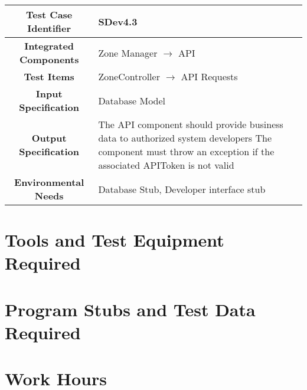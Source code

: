 \documentclass[11pt, a4paper,titlepage]{article}
\begin{document}
			\begin{tabularx}{\textwidth}{| c|X|}
				\hline \textbf{Test Case Identifier} & \label{SDev4.3}SDev4.3 \\
				\hline \textbf{Integrated Components} & Zone Manager $\rightarrow $ API \\
				\hline \textbf{Test Items} & ZoneController $\rightarrow $ API Requests \\
				\hline \textbf{Input Specification} & Database Model \\
				\hline \textbf{Output Specification} & The API component should provide business data to authorized system developers
				\newline The component must throw an exception if the associated APIToken is not valid \\
				\hline \textbf{Environmental Needs} & Database Stub, Developer interface stub \\
				\hline
			\end{tabularx}
			\newline
			
	\newpage
	\section{Tools and Test Equipment Required}
	\section{Program Stubs and Test Data Required}
	\section{Work Hours}
	
\end{document}
